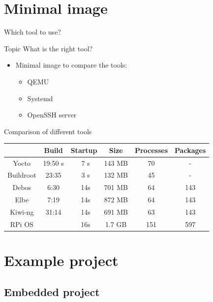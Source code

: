 \documentclass{beamer}
\begin{document}
\section{Minimal image}

\begin{frame}{Which tool to use?}
	\begin{block}{Topic}
		What is the right tool?
	\end{block}

	\begin{itemize}
		\item Minimal image to compare the tools:
		\begin{itemize}
			\item QEMU
			\item Systemd 
			\item OpenSSH server
		\end{itemize}
	\end{itemize}
\end{frame}

\begin{frame}{Comparison of different tools}
	\begin{tabular}{c|ccccc}
		& \textbf{Build} & \textbf{Startup} & \textbf{Size} & \textbf{Processes} & \textbf{Packages} \\
		\hline
		Yocto & 19:50 s & ~7 s & 143 MB & 70 & - \\ 
		Buildroot & 23:35 & ~3 s & 132 MB & 45 & - \\
		\hline
		Debos & 6:30 & ~14s & 701 MB & 64 & 143 \\
		Elbe & 7:19 & ~14s & 872 MB & 64 & 143 \\
		Kiwi-ng & 31:14 & ~14s & 691 MB & 63 & 143 \\
		\hline
		RPi OS & & ~16s & 1.7 GB & 151 & 597 \\
	\end{tabular}
\end{frame}


\section{Example project}

\subsection{Embedded project}

\end{document}
